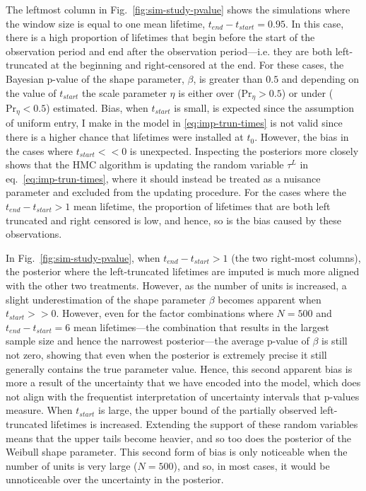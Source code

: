 The leftmost column in Fig.~\ref{fig:sim-study-pvalue} shows the simulations where the window size is equal to one mean lifetime, $t_{end} - t_{start} = 0.95$. In this case, there is a high proportion of lifetimes that begin before the start of the observation period and end after the observation period---i.e. they are both left-truncated at the beginning and right-censored at the end. For these cases, the Bayesian p-value of the shape parameter, $\beta$, is greater than $0.5$ and depending on the value of $t_{start}$ the scale parameter $\eta$ is either over ($\text{Pr}_{\eta} > 0.5$) or under ($\text{Pr}_{\eta} < 0.5$) estimated. Bias, when $t_{start}$ is small, is expected since the assumption of uniform entry, I make in the model in \eqref{eq:imp-trun-times} is not valid since there is a higher chance that lifetimes were installed at $t_0$. However, the bias in the cases where $t_{start} << 0$ is unexpected. Inspecting the posteriors more closely shows that the HMC algorithm is updating the random variable $\tau^L$ in eq.~\eqref{eq:imp-trun-times}, where it should instead be treated as a nuisance parameter and excluded from the updating procedure. For the cases where the $t_{end} - t_{start} > 1$ mean lifetime, the proportion of lifetimes that are both left truncated and right censored is low, and hence, so is the bias caused by these observations. 

In Fig.~\ref{fig:sim-study-pvalue}, when $t_{end} - t_{start} > 1$ (the two right-most columns), the posterior where the left-truncated lifetimes are imputed is much more aligned with the other two treatments. However, as the number of units is increased, a slight underestimation of the shape parameter $\beta$ becomes apparent when $t_{start} >> 0$. However, even for the factor combinations where $N = 500$ and $t_{end} - t_{start} = 6$ mean lifetimes---the combination that results in the largest sample size and hence the narrowest posterior---the average p-value of $\beta$ is still not zero, showing that even when the posterior is extremely precise it still generally contains the true parameter value. Hence, this second apparent bias is more a result of the uncertainty that we have encoded into the model, which does not align with the frequentist interpretation of uncertainty intervals that p-values measure. When $t_{start}$ is large, the upper bound of the partially observed left-truncated lifetimes is increased. Extending the support of these random variables means that the upper tails become heavier, and so too does the posterior of the Weibull shape parameter. This second form of bias is only noticeable when the number of units is very large ($N = 500$), and so, in most cases, it would be unnoticeable over the uncertainty in the posterior.

